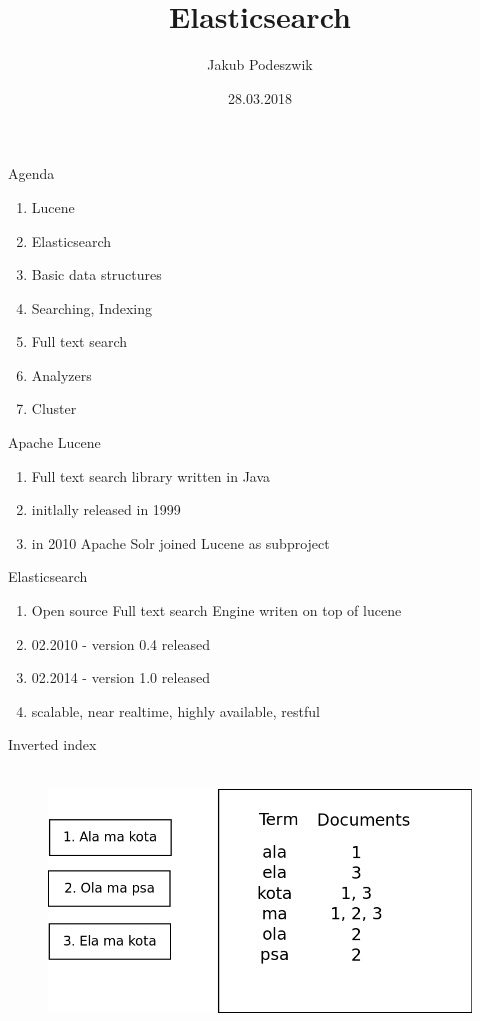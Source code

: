 \documentclass{beamer}
\title[Elasticsearch]{Elasticsearch}
\author{Jakub Podeszwik}
\institute{Yameo}
\date{28.03.2018}
\begin{document}
\begin{frame}
  \titlepage
\end{frame}

\begin{frame}{Agenda}
	\begin{enumerate}
		\item Lucene
		\item Elasticsearch
		\item Basic data structures
		\item Searching, Indexing
		\item Full text search
		\item Analyzers
		\item Cluster
	\end{enumerate}
\end{frame}
\begin{frame}{Apache Lucene}
	\begin{enumerate}
		\item Full text search library written in Java
		\item initlally released in 1999
		\item in 2010 Apache Solr joined Lucene as subproject
	\end{enumerate}
\end{frame}
\begin{frame}{Elasticsearch}
	\begin{enumerate}
		\item Open source Full text search Engine writen on top of lucene
		\item 02.2010 - version 0.4 released
		\item 02.2014 - version 1.0 released
		\item scalable, near realtime, highly available, restful
	\end{enumerate}
\end{frame}
\begin{frame}{Inverted index}
	\begin{figure}
		\includegraphics[width=\textwidth,height=7cm,keepaspectratio=true]{inverted-index}
	\end{figure}
\end{frame}
\end{document}
